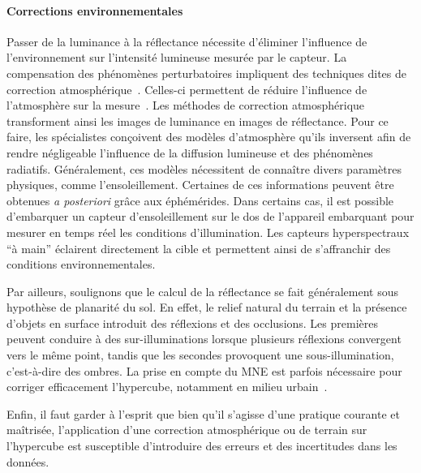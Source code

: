 \paragraph{Corrections environnementales}
Passer de la luminance à la réflectance nécessite d'éliminer l'influence de l'environnement sur l'intensité lumineuse mesurée par le capteur. La compensation des phénomènes perturbatoires impliquent des techniques dites de correction atmosphérique~\cite{deschamps_atmospheric_1980, rahman_smac_1994, chavez_image-based_1996}. Celles-ci permettent de réduire l'influence de l'atmosphère sur la mesure~\cite{gao_atmospheric_2009}. Les méthodes de correction atmosphérique transforment ainsi les images de luminance en images de réflectance. Pour ce faire, les spécialistes conçoivent des modèles d'atmosphère qu'ils inversent afin de rendre négligeable l'influence de la diffusion lumineuse et des phénomènes radiatifs. Généralement, ces modèles nécessitent de connaître divers paramètres physiques, comme l'ensoleillement. Certaines de ces informations peuvent être obtenues \emph{a posteriori} grâce aux éphémérides. Dans certains cas, il est possible d'embarquer un capteur d'ensoleillement sur le dos de l'appareil embarquant pour mesurer en temps réel les conditions d'illumination. Les capteurs hyperspectraux ``à main'' éclairent directement la cible et permettent ainsi de s'affranchir des conditions environnementales.

Par ailleurs, soulignons que le calcul de la réflectance se fait généralement sous hypothèse de planarité du sol. En effet, le relief natural du terrain et la présence d'objets en surface introduit des réflexions et des occlusions. Les premières peuvent conduire à des sur-illuminations lorsque plusieurs réflexions convergent vers le même point, tandis que les secondes provoquent une sous-illumination, c'est-à-dire des ombres. La prise en compte du \gls{MNE} est parfois nécessaire pour corriger efficacement l'hypercube, notamment en milieu urbain~\cite{ceamanos_using_2017}.

Enfin, il faut garder à l'esprit que bien qu'il s'agisse d'une pratique courante et maîtrisée, l'application d'une correction atmosphérique ou de terrain sur l'hypercube est susceptible d'introduire des erreurs et des incertitudes dans les données.

